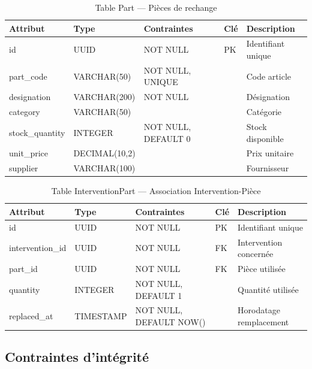 \begin{table}[htbp]
\centering
\scriptsize
\caption{Table Part — Pièces de rechange}
\label{tab:table_part}
\begin{tabular}{|p{2.5cm}|p{2cm}|p{2cm}|p{1.5cm}|p{4cm}|}
\hline
\rowcolor{sewesblu!20}
\textbf{Attribut} & \textbf{Type} & \textbf{Contraintes} & \textbf{Clé} & \textbf{Description} \\
\hline
id & UUID & NOT NULL & PK & Identifiant unique \\
\hline
part\_code & VARCHAR(50) & NOT NULL, UNIQUE & & Code article \\
\hline
designation & VARCHAR(200) & NOT NULL & & Désignation \\
\hline
category & VARCHAR(50) & & & Catégorie \\
\hline
stock\_quantity & INTEGER & NOT NULL, DEFAULT 0 & & Stock disponible \\
\hline
unit\_price & DECIMAL(10,2) & & & Prix unitaire \\
\hline
supplier & VARCHAR(100) & & & Fournisseur \\
\hline
\end{tabular}
\end{table}

\begin{table}[htbp]
\centering
\scriptsize
\caption{Table InterventionPart — Association Intervention-Pièce}
\label{tab:table_intervention_part}
\begin{tabular}{|p{2.5cm}|p{2cm}|p{2cm}|p{1.5cm}|p{4cm}|}
\hline
\rowcolor{sewesblu!20}
\textbf{Attribut} & \textbf{Type} & \textbf{Contraintes} & \textbf{Clé} & \textbf{Description} \\
\hline
id & UUID & NOT NULL & PK & Identifiant unique \\
\hline
intervention\_id & UUID & NOT NULL & FK & Intervention concernée \\
\hline
part\_id & UUID & NOT NULL & FK & Pièce utilisée \\
\hline
quantity & INTEGER & NOT NULL, DEFAULT 1 & & Quantité utilisée \\
\hline
replaced\_at & TIMESTAMP & NOT NULL, DEFAULT NOW() & & Horodatage remplacement \\
\hline
\end{tabular}
\end{table}



\subsection{Contraintes d'intégrité}

